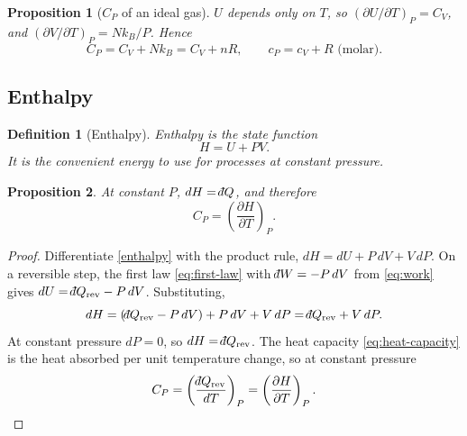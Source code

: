 \documentclass{article}
\newtheorem{definition}{Definition}
\newtheorem{proposition}{Proposition}
\newcommand{\dbar}{\mathchar'26\mkern-12mu d}
\begin{document}
\begin{proposition}[$C_P$ of an ideal gas]
    $U$ depends only on $T$, so $(\partial U/\partial T)_P = C_V$, and $(\partial V/\partial T)_P = Nk_B/P$. Hence
    \[C_P = C_V + Nk_B = C_V + nR, \qquad c_P = c_V + R \text{ (molar)}.\]
\end{proposition}

\subsection{Enthalpy}
\begin{definition}[Enthalpy]
    Enthalpy is the state function
    \begin{equation}
        \label{enthalpy}
        H = U + PV.
    \end{equation}
    It is the convenient energy to use for processes at constant pressure.
\end{definition}

\begin{proposition}
    At constant $P$, $dH = \dbar Q$, and therefore
    \begin{equation}
        C_P = \left(\frac{\partial H}{\partial T}\right)_P.
    \end{equation}
\end{proposition}
\begin{proof}
    Differentiate \ref{enthalpy} with the product rule, $dH = dU + P\,dV + V\,dP$. On a reversible step, the first law \eqref{eq:first-law} with $\dbar W = -P\,dV$ from \eqref{eq:work} gives $dU = \dbar Q_{\text{rev}} - P\,dV$. Substituting,
    \[dH = \left(\dbar Q_{\text{rev}} - P\,dV\right) + P\,dV + V\,dP = \dbar Q_{\text{rev}} + V\,dP.\]
    At constant pressure $dP = 0$, so $dH = \dbar Q_{\text{rev}}$. The heat capacity \eqref{eq:heat-capacity} is the heat absorbed per unit temperature change, so at constant pressure
    \[C_P = \left(\frac{\dbar Q_{\text{rev}}}{dT}\right)_P = \left(\frac{\partial H}{\partial T}\right)_P.\]
\end{proof}
\end{document}
